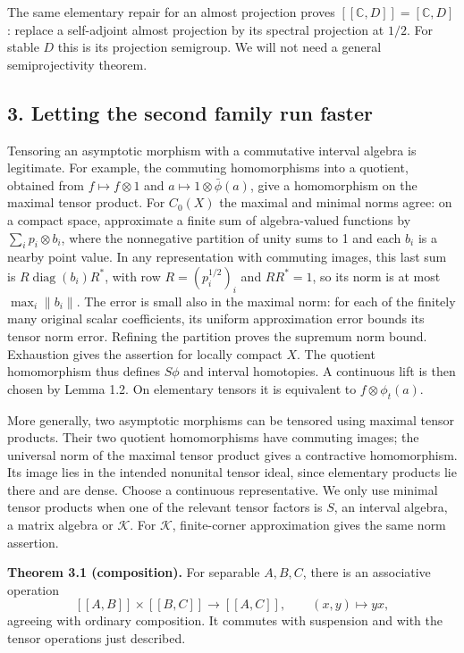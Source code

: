\documentclass[
  11pt,
]{article}
\begin{document}
The same elementary repair for an almost projection proves
\([[\mathbb C,D]]=[\mathbb C,D]\): replace a self-adjoint almost
projection by its spectral projection at \(1/2\). For stable \(D\) this
is its projection semigroup. We will not need a general semiprojectivity
theorem.

\subsection{3. Letting the second family run
faster}\label{letting-the-second-family-run-faster}

Tensoring an asymptotic morphism with a commutative interval algebra is
legitimate. For example, the commuting homomorphisms into a quotient,
obtained from \(f\mapsto f\otimes1\) and
\(a\mapsto1\otimes\bar\phi(a)\), give a homomorphism on the maximal
tensor product. For \(C_0(X)\) the maximal and minimal norms agree: on a
compact space, approximate a finite sum of algebra-valued functions by
\(\sum_i p_i\otimes b_i\), where the nonnegative partition of unity sums
to 1 and each \(b_i\) is a nearby point value. In any representation
with commuting images, this last sum is
\(R\operatorname{diag}(b_i)R^*\), with row \(R=(p_i^{1/2})_i\) and
\(RR^*=1\), so its norm is at most \(\max_i\|b_i\|\). The error is small
also in the maximal norm: for each of the finitely many original scalar
coefficients, its uniform approximation error bounds its tensor norm
error. Refining the partition proves the supremum norm bound. Exhaustion
gives the assertion for locally compact \(X\). The quotient homomorphism
thus defines \(S\phi\) and interval homotopies. A continuous lift is
then chosen by Lemma 1.2. On elementary tensors it is equivalent to
\(f\otimes\phi_t(a)\).

More generally, two asymptotic morphisms can be tensored using maximal
tensor products. Their two quotient homomorphisms have commuting images;
the universal norm of the maximal tensor product gives a contractive
homomorphism. Its image lies in the intended nonunital tensor ideal,
since elementary products lie there and are dense. Choose a continuous
representative. We only use minimal tensor products when one of the
relevant tensor factors is \(S\), an interval algebra, a matrix algebra
or \(\mathcal K\). For \(\mathcal K\), finite-corner approximation gives
the same norm assertion.

\textbf{Theorem 3.1 (composition).} For separable \(A,B,C\), there is an
associative operation \[
[[A,B]]\times[[B,C]]\longrightarrow[[A,C]],
\qquad (x,y)\longmapsto yx,
\tag{3.1}
\] agreeing with ordinary composition. It commutes with suspension and
with the tensor operations just described.
\end{document}
